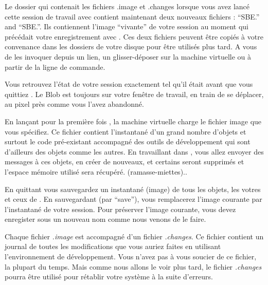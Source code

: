 \documentclass[a4paper,10pt,twoside]{book}
\begin{document}

Le dossier qui contenait les fichiers .image et .changes lorsque vous avez lancé cette session de travail avec \sq contient maintenant deux nouveaux fichiers : ``SBE.'' and ``SBE.''. Ils contiennent l'image ``vivante'' de votre session \sq au moment qui précédait votre enregistrement avec .
Ces deux fichiers peuvent être copiés à votre convenance dans les dossiers  de votre disque pour être utilisés plus tard. A vous de les invoquer depuis un lien, un glisser-déposer sur la machine virtuelle ou à partir de la ligne de commande.


Vous retrouvez l'état de votre session exactement tel qu'il était avant que vous quittiez \sq. Le Blob est toujours sur votre fenêtre de travail, en train de se déplacer, au pixel près comme vous l'avez abandonné.


En lançant pour la première fois \sq, la machine virtuelle charge le fichier image que vous spécifiez. Ce fichier contient l'instantané d'un grand nombre d'objets et surtout le code pré-existant accompagné des outils de développement qui sont d'ailleurs des objets comme les autres. En travaillant dans \sq, vous allez envoyer des messages à ces objets, en créer de nouveaux, et certains seront supprimés et l'espace mémoire utilisé sera récupéré. (\ie ramasse-miettes)..

En quittant \sq vous sauvegardez un instantané (image) de tous les objets, les votres et ceux de \sq. En sauvegardant (par ``save''), vous remplacerez l'image courante par l'instantané de votre session. Pour préserver l'image courante, vous devez enregister sous un nouveau nom comme nous venons de le faire.

Chaque fichier \emph{.image} est accompagné d'un fichier \emph{.changes}.
Ce fichier contient un journal de toutes les modifications que vous auriez faites en utilisant l'environnement de développement.
Vous n'avez pas à vous soucier de ce fichier, la plupart du temps.
Mais comme nous allons le voir plus tard, le fichier \emph{.changes} pourra être utilisé pour rétablir votre système \sq à la suite d'erreurs.
\end{document}
